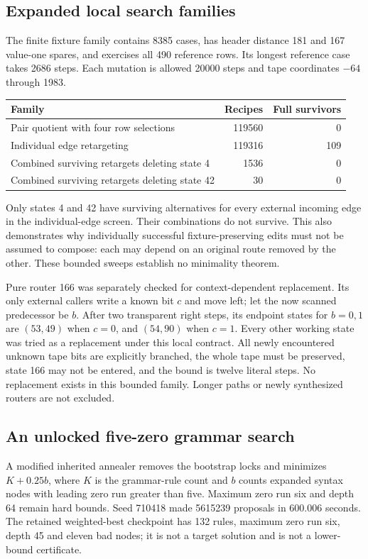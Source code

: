 \subsection{Expanded local search families}

The finite fixture family contains 8385 cases, has header distance 181 and
167 value-one spares, and exercises all 490 reference rows.  Its longest
reference case takes 2686 steps.  Each mutation is allowed 20000 steps and
tape coordinates $-64$ through 1983.
\begin{center}\small
\begin{tabular}{lrr}
Family & Recipes & Full survivors\\\hline
Pair quotient with four row selections & 119560 & 0\\
Individual edge retargeting & 119316 & 109\\
Combined surviving retargets deleting state 4 & 1536 & 0\\
Combined surviving retargets deleting state 42 & 30 & 0
\end{tabular}
\end{center}
Only states 4 and 42 have surviving alternatives for every external incoming
edge in the individual-edge screen.  Their combinations do not survive.
This also demonstrates why individually successful fixture-preserving edits
must not be assumed to compose: each may depend on an original route removed
by the other.  These bounded sweeps establish no minimality theorem.

Pure router 166 was separately checked for context-dependent replacement.
Its only external callers write a known bit $c$ and move left; let the now
scanned predecessor be $b$.  After two transparent right steps, its endpoint
states for $b=0,1$ are $(53,49)$ when $c=0$, and $(54,90)$ when $c=1$.
Every other working state was tried as a replacement under this local
contract.  All newly encountered unknown tape bits are explicitly branched,
the whole tape must be preserved, state 166 may not be entered, and the
bound is twelve literal steps.  No replacement exists in this bounded
family.  Longer paths or newly synthesized routers are not excluded.

\subsection{An unlocked five-zero grammar search}

A modified inherited annealer removes the bootstrap locks and minimizes
$K+0.25b$, where $K$ is the grammar-rule count and $b$ counts expanded syntax
nodes with leading zero run greater than five.  Maximum zero run six and
depth 64 remain hard bounds.  Seed 710418 made 5615239 proposals in
600.006 seconds.  The retained weighted-best checkpoint has 132 rules,
maximum zero run six, depth 45 and eleven bad nodes; it is not a target
solution and is not a lower-bound certificate.

